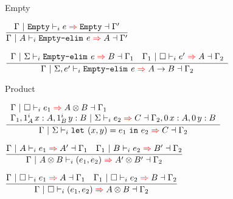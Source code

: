 \documentclass{beamer}
\begin{document}
\begin{frame}{Empty}

\begin{center}
  $\infrule{\infer{\Gamma}{\typehint{\Empty}}{e}{\Empty}{\Gamma'}}{\infer{\Gamma}{\typehint{A}}{\emptyelim{e}}{A}{\Gamma'}}$

  \vspace{2em}

  $\infrule{\begin{array}{l} \infer{\Gamma}{\Sigma}{\emptyelim{e}}{B}{\Gamma_1} \quad \infer{\Gamma_1}{\emptyhint}{e'}{A}{\Gamma_2} \end{array}}{\infer{\Gamma}{\arghint{\Sigma}{e'}}{\emptyelim{e}}{\Fun{A}{B}}{\Gamma_2}}$
\end{center}

\end{frame}

\begin{frame}{Product}

\begin{center}
  $\infrule{\begin{array}{l} \infer{\Gamma}{\emptyhint}{e_1}{\Prod{A}{B}}{\Gamma_1} \\ \infer{\extend{\extend{\Gamma_1}[\totalqty{\One}{A}]{x}{A}}[\totalqty{\One}{B}]{y}{B}}{\Sigma}{e_2}{C}{\extend{\extend{\Gamma_2}[\Zero]{x}{A}}[\Zero]{y}{B}} \end{array}}{\infer{\Gamma}{\Sigma}{\letpair{x}{y}{e_1}{e_2}}{C}{\Gamma_2}}$

  \vspace{2em}

  $\infrule{\infer{\Gamma}{\typehint{A}}{e_1}{A'}{\Gamma_1} \quad \infer{\Gamma_1}{\typehint{B}}{e_2}{B'}{\Gamma_2}}{\infer{\Gamma}{\typehint{\Prod{A}{B}}}{\pair{e_1}{e_2}}{\Prod{A'}{B'}}{\Gamma_2}}$

  \vspace{2em}

  $\infrule{\infer{\Gamma}{\emptyhint}{e_1}{A}{\Gamma_1} \quad \infer{\Gamma_1}{\emptyhint}{e_2}{B}{\Gamma_2}}{\infer{\Gamma}{\emptyhint}{\pair{e_1}{e_2}}{\Prod{A}{B}}{\Gamma_2}}$
\end{center}

\end{frame}
\end{document}

